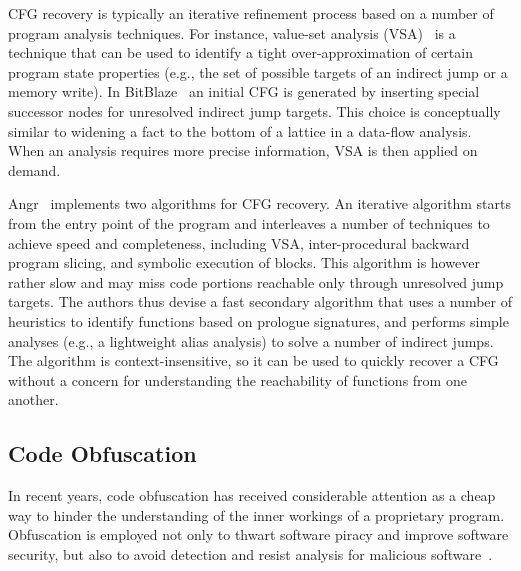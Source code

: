 CFG recovery is typically an iterative refinement process based on a number of program analysis techniques. For instance, value-set analysis (VSA)~\cite{VSA-CC04} is a technique that can be used to identify a tight over-approximation of certain program state properties (e.g., the set of possible targets of an indirect jump or a memory write). In {\sc BitBlaze}~\cite{BITBLAZE-ICISS08} an initial CFG is generated by inserting special successor nodes for unresolved indirect jump targets. This choice is conceptually similar to widening a fact to the bottom of a lattice in a data-flow analysis. When an analysis requires more precise information, VSA is then applied on demand. %

{\sc Angr}~\cite{ANGR-SSP16} implements two algorithms for CFG recovery. An iterative algorithm starts from the entry point of the program and interleaves a number of techniques to achieve speed and completeness, including VSA, inter-procedural backward program slicing, and symbolic execution of blocks. This algorithm is however rather slow and may miss code portions reachable only through unresolved jump targets. The authors thus devise a fast secondary algorithm that uses a number of heuristics to identify functions based on prologue signatures, and performs simple analyses (e.g., a lightweight alias analysis) to solve a number of indirect jumps. The algorithm is context-insensitive, so it can be used to quickly recover a CFG without a concern for understanding the reachability of functions from one another. 

\subsection{Code Obfuscation}
In recent years, code obfuscation has received considerable attention as a cheap way to hinder the understanding of the inner workings of a proprietary program. Obfuscation is employed not only to thwart software piracy and improve software security, but also to avoid detection and resist analysis for malicious software~\cite{UDM-WCRE15,YJW-SSP15}.

